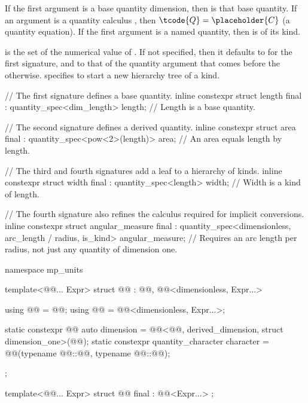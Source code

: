 \pnum
If the first argument is a base quantity dimension,
then  is that base quantity.
If an argument is a quantity calculus ,
then $\tcode{Q} = \placeholder{C}$ (a quantity equation).
If the first argument is a named quantity,
then  is of its kind.

\pnum
{} is the set of the numerical value of .
If not specified, then it defaults to  for the first signature,
and to that of the quantity argument that comes before the  otherwise.
 specifies  to start a new hierarchy tree of a kind.

\pnum
\begin{example}
\begin{codeblock}
// The first signature defines a base quantity.
inline constexpr struct length final : quantity_spec<dim_length> {
} length;  // Length is a base quantity.

// The second signature defines a derived quantity.
inline constexpr struct area final : quantity_spec<pow<2>(length)> {
} area;  // An area equals length by length.

// The third and fourth signatures add a leaf to a hierarchy of kinds.
inline constexpr struct width final : quantity_spec<length> {
} width;  // Width is a kind of length.

// The fourth signature also refines the calculus required for implicit conversions.
inline constexpr struct angular_measure final :
    quantity_spec<dimensionless, arc_length / radius, is_kind> {
} angular_measure;  // Requires an arc length per radius, not just any quantity of dimension one.
\end{codeblock}
\end{example}

\begin{codeblock}
namespace mp_units {

template<@@... Expr>
struct @@ :
    @@,
    @@<dimensionless, Expr...> {
  using @@ = @@;
  using @@ = @@<dimensionless, Expr...>;

  static constexpr @@ auto dimension =
    @@<@@, derived_dimension, struct dimension_one>(@@{});
  static constexpr quantity_character character =
    @@(typename @@::@@{}, typename @@::@@{});
};

template<@@... Expr>
struct @@ final : @@<Expr...> {};

}
\end{codeblock}


